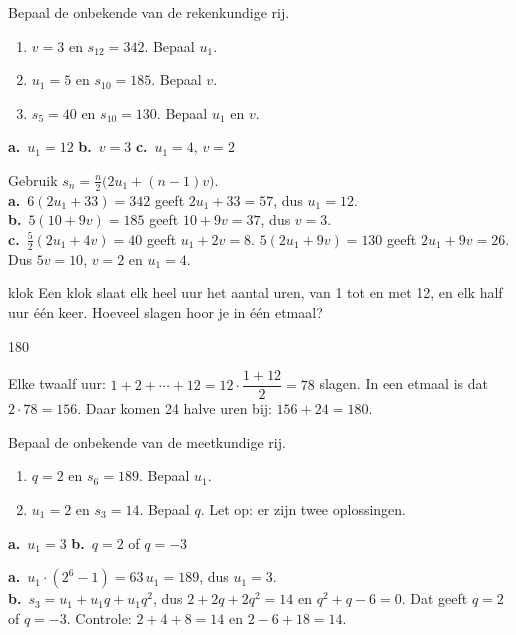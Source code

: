 \begin{oefeningen}
\begin{oefening}[2]
Bepaal de onbekende van de rekenkundige rij.
\begin{enumerate}
  \item $v = 3$ en $s_{12} = 342$. Bepaal $u_1$.
  \item $u_1 = 5$ en $s_{10} = 185$. Bepaal $v$.
  \item $s_5 = 40$ en $s_{10} = 130$. Bepaal $u_1$ en $v$.
\end{enumerate}
\begin{solution}
\textbf{a.}~$u_1=12$ \quad \textbf{b.}~$v=3$ \quad \textbf{c.}~$u_1=4$, $v=2$
\end{solution}
\begin{fullsolution}
Gebruik $s_n=\tfrac{n}{2}\bigl(2u_1+(n-1)v\bigr)$.\\
\textbf{a.}~$6(2u_1+33)=342$ geeft $2u_1+33=57$, dus $u_1=12$.\\
\textbf{b.}~$5(10+9v)=185$ geeft $10+9v=37$, dus $v=3$.\\
\textbf{c.}~$\tfrac52(2u_1+4v)=40$ geeft $u_1+2v=8$. $5(2u_1+9v)=130$ geeft $2u_1+9v=26$. Dus $5v=10$, $v=2$ en $u_1=4$.
\end{fullsolution}
\end{oefening}

\begin{oefening}[2]
\begin{metprent}{klok}
Een klok slaat elk heel uur het aantal uren, van 1 tot en met 12, en elk half uur één keer. Hoeveel slagen hoor je in één etmaal?
\end{metprent}
\begin{solution}
180
\end{solution}
\begin{fullsolution}
Elke twaalf uur: $1+2+\cdots+12=12\cdot\dfrac{1+12}{2}=78$ slagen. In een etmaal is dat $2\cdot 78=156$. Daar komen 24 halve uren bij: $156+24=180$.
\end{fullsolution}
\end{oefening}

\begin{oefening}[2]
Bepaal de onbekende van de meetkundige rij.
\begin{enumerate}
  \item $q = 2$ en $s_6 = 189$. Bepaal $u_1$.
  \item $u_1 = 2$ en $s_3 = 14$. Bepaal $q$. Let op: er zijn twee oplossingen.
\end{enumerate}
\begin{solution}
\textbf{a.}~$u_1=3$ \quad \textbf{b.}~$q=2$ of $q=-3$
\end{solution}
\begin{fullsolution}
\textbf{a.}~$u_1\cdot(2^6-1)=63\,u_1=189$, dus $u_1=3$.\\
\textbf{b.}~$s_3=u_1+u_1q+u_1q^2$, dus $2+2q+2q^2=14$ en $q^2+q-6=0$. Dat geeft $q=2$ of $q=-3$. Controle: $2+4+8=14$ en $2-6+18=14$.
\end{fullsolution}
\end{oefening}


\end{oefeningen}
